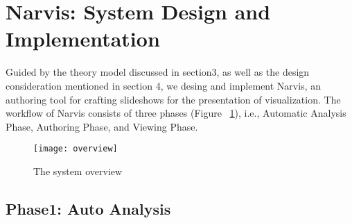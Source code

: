 \section{Narvis: System Design and Implementation}


Guided by the theory model discussed in section3, as well as the design consideration mentioned in section 4, we desing and implement Narvis, an authoring tool for crafting slideshows for the presentation of visualization. The workflow of Narvis consists of three phases (Figure ~\ref{fig:overview}), i.e., Automatic Analysis Phase, Authoring Phase, and Viewing Phase.


\begin{figure}
 \centering %
 \texttt{[image: overview]}
 \caption{The system overview}
 \label{fig:overview}
\end{figure}

\subsection{Phase1: Auto Analysis}


